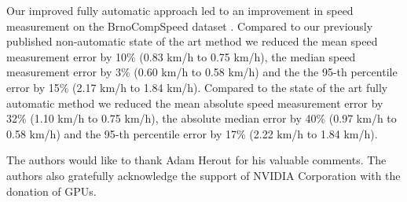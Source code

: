 \documentclass[twocolumn]{svjour3}          \smartqed  \usepackage{graphicx}
\begin{document}
Our improved fully automatic approach led to an improvement in speed measurement on the BrnoCompSpeed dataset \cite{brnocompspeed}. Compared to our previously published non-automatic state of the art method \cite{CVWW2019} we reduced the mean speed measurement error by 10\% (0.83 km/h to 0.75 km/h), the median speed measurement error by 3\% (0.60 km/h to 0.58 km/h) and the the 95-th percentile error by 15\% (2.17 km/h to 1.84 km/h). Compared to the state of the art fully automatic method \cite{sochor2017} we reduced the mean absolute speed measurement error by 32\% (1.10 km/h to 0.75 km/h), the absolute median error by 40\% (0.97 km/h to 0.58 km/h) and the 95-th percentile error by 17\% (2.22 km/h to 1.84 km/h). 

\begin{acknowledgements}
The authors would like to thank Adam Herout for his valuable comments.  The authors also gratefully acknowledge the support of NVIDIA Corporation with the donation of GPUs.
\end{acknowledgements}





         
\end{document}
